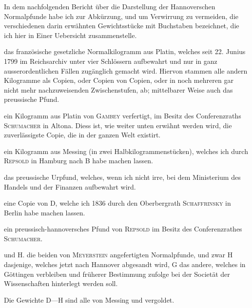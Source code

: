 In dem nachfolgenden Bericht über die Darstellung der Hannoverschen
Normalpfunde habe ich zur Abkürzung, und um Verwirrung zu vermeiden,
die verschiedenen darin erwähnten Gewichtsstücke mit Buchstaben bezeichnet,
die ich hier in Einer Uebersicht zusammenstelle.
\begin{list}{}{\setlength{\leftmargin}{2.4em}\setlength{\labelwidth}{1.6em}\setlength{\labelsep}{.5em}\setlength{\itemsep}{0pt}\setlength{\parsep}{0pt}\setlength{\topsep}{0pt}}
\item[A.] das französische gesetzliche Normalkilogramm aus Platin, welches seit
22. Junius 1799 im Reichsarchiv unter vier Schlössern aufbewahrt
und nur in ganz ausserordentlichen Fällen zugänglich gemacht wird.
Hiervon stammen alle andern Kilogramme als Copien, oder Copien
von Copien, oder in noch mehreren gar nicht mehr nachzuweisenden
Zwischenstufen, ab; mittelbarer Weise auch das preussische Pfund.
\item[B.] ein Kilogramm aus Platin von \textsc{Gambey} verfertigt, im Besitz des Conferenzraths
\textsc{Schumacher} in Altona. Diess ist, wie weiter unten erwähnt
\clearpage{}
\noindent werden wird, die zuverlässigste Copie, die in der ganzen Welt
existirt.
\item[C.] ein Kilogramm aus Messing (in zwei Halbkilogrammenstücken), welches
ich durch \textsc{Repsold} in Hamburg nach B habe machen lassen.
\item[D.] das preussische Urpfund, welches, wenn ich nicht irre, bei dem Ministerium
des Handels und der Finanzen aufbewahrt wird.
\item[E.] eine Copie von D, welche ich 1836 durch den Oberbergrath \textsc{Schaffrinsky}
in Berlin habe machen lassen.
\item[F.] ein preussisch-hannoversches Pfund von \textsc{Repsold} im Besitz des Conferenzrathes
\textsc{Schumacher}.
\item[G.] und H. die beiden von \textsc{Meyerstein} angefertigten Normalpfunde, und
zwar H dasjenige, welches jetzt nach Hannover abgesandt wird, G das
andere, welches in Göttingen verbleiben und früherer Bestimmung
zufolge bei der Societät der Wissenschaften hinterlegt werden soll.
\end{list}
\noindent\hspace*{\parindent}Die Gewichte D—H sind alle von Messing und vergoldet.

